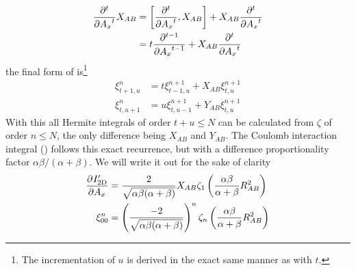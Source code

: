         \begin{align}
            \prd{A_x}[][t] X_{AB} &= \left[\prd{A_x}[][t], X_{AB}\right] +
            X_{AB}\prd{A_x}[][t] \nonumber \\
            &= t\prd{A_x}[][t-1] + X_{AB}\prd{A_x}[][t]
        \end{align}
    the final form of  is\footnote{The incrementation of $u$ is
    derived in the exact same manner as with $t$.}
        \begin{equation}
            \begin{aligned}
                \xi^n_{t+1,u} &= t\xi^{n+1}_{t-1,u} + X_{AB}\xi^{n+1}_{t,u} \\
                \xi^n_{t,u+1} &= u\xi^{n+1}_{t,u-1} + Y_{AB}\xi^{n+1}_{t,u}
            \end{aligned}
        \end{equation}
    With this all Hermite integrals of order $t+u\leq N$ can be calculated from
    $\zeta$ of order $n\leq N$, the only difference being $X_{AB}$ and
    $Y_{AB}$. The Coulomb interaction integral
    () follows this exact recurrence, but
    with a difference proportionality factor $\alpha\beta/(\alpha+\beta)$. We
    will write it out for the sake of clarity
        \begin{equation}
            \begin{aligned}
                \prd{A_x}[I'_{\text{2D}}] &=
                \frac{2}{\sqrt{\alpha\beta(\alpha+\beta)}}
                X_{AB}\zeta_1\left(\frac{\alpha\beta}{\alpha+\beta}R^2_{AB}\right)
                \\
                \xi^n_{00} &=
                \left(\frac{-2}{\sqrt{\alpha\beta(\alpha+\beta)}}\right)^n
                \zeta_n\left(\frac{\alpha\beta}{\alpha+\beta} R^2_{AB}\right)
            \end{aligned}
        \end{equation}

% 

